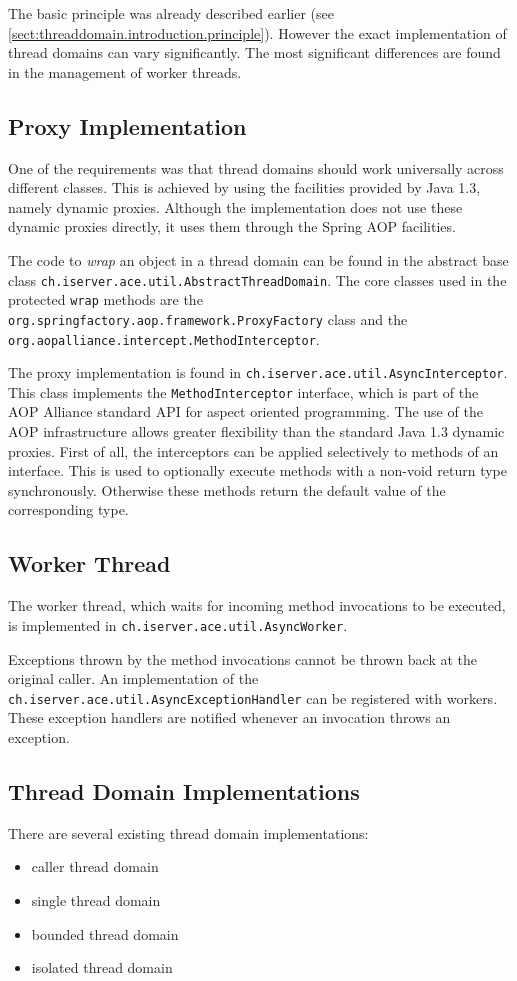 The basic principle was already described earlier 
(see \ref{sect:threaddomain.introduction.principle}). However the exact
implementation of thread domains can vary significantly. The most significant
differences are found in the management of worker threads.


\subsection{Proxy Implementation}
One of the requirements was that thread domains should work universally across
different classes. This is achieved by using the facilities provided by
Java 1.3, namely dynamic proxies. Although the implementation does not use
these dynamic proxies directly, it uses them through the Spring AOP facilities.

The code to \emph{wrap} an object in a thread domain can be found in the
abstract base class \texttt{ch.iserver.ace.util.AbstractThreadDomain}. The
core classes used in the protected \texttt{wrap} methods are the
\texttt{org.springfactory.aop.framework.ProxyFactory} class and the 
\texttt{org.aopalliance.intercept.MethodInterceptor}. 

The proxy implementation is found in 
\texttt{ch.iserver.ace.util.AsyncInterceptor}. This class implements the
\texttt{MethodInterceptor} interface, which is part of the AOP Alliance
standard API for aspect oriented programming. The use of the AOP 
infrastructure allows greater flexibility than the standard Java 1.3 dynamic
proxies. First of all, the interceptors can be applied selectively to
methods of an interface. This is used to optionally execute methods with 
a non-void return type synchronously. Otherwise these methods return
the default value of the corresponding type.


\subsection{Worker Thread}
The worker thread, which waits for incoming method invocations to be
executed, is implemented in \texttt{ch.iserver.ace.util.AsyncWorker}.

Exceptions thrown by the method invocations cannot be thrown back at the
original caller. An implementation of the 
\texttt{ch.iserver.ace.util.AsyncExceptionHandler} can be registered with
workers. These exception handlers are notified whenever an invocation
throws an exception.


\subsection{Thread Domain Implementations}
There are several existing thread domain implementations:
\begin{itemize}
 \item caller thread domain
 \item single thread domain
 \item bounded thread domain
 \item isolated thread domain
\end{itemize}


